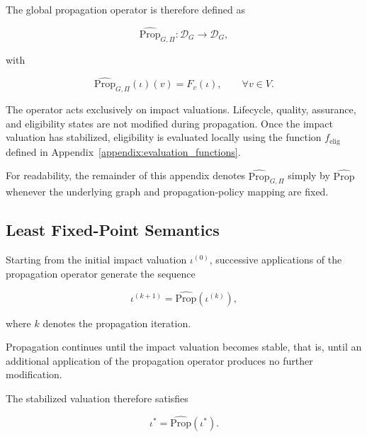 \documentclass[10pt]{article}
\begin{document}
The global propagation operator is therefore defined as

\begin{equation}
	\label{eq:impact_operator}
	\widehat{\mathrm{Prop}}_{G,\Pi}
	:
	\mathcal D_G
	\rightarrow
	\mathcal D_G,
\end{equation}

with

\begin{equation}
	\label{eq:impact_operator_definition}
	\widehat{\mathrm{Prop}}_{G,\Pi}(\iota)(v)
	=
	F_v(\iota),
	\qquad
	\forall v\in V.
\end{equation}

The operator acts exclusively on impact valuations.
Lifecycle, quality, assurance, and eligibility states are not modified during
propagation. Once the impact valuation has stabilized, eligibility is evaluated
locally using the function
$f_{\mathrm{elig}}$
defined in Appendix~\ref{appendix:evaluation_functions}.

For readability, the remainder of this appendix denotes
$\widehat{\mathrm{Prop}}_{G,\Pi}$ simply by
$\widehat{\mathrm{Prop}}$
whenever the underlying graph and propagation-policy mapping are fixed.

\subsection{Least Fixed-Point Semantics}

Starting from the initial impact valuation
$\iota^{(0)}$, successive applications of the propagation operator generate the
sequence

\begin{equation}
	\label{eq:impact_iteration}
	\iota^{(k+1)}
	=
	\widehat{\mathrm{Prop}}
	\!\left(
	\iota^{(k)}
	\right),
\end{equation}

where $k$ denotes the propagation iteration.

Propagation continues until the impact valuation becomes stable, that is, until
an additional application of the propagation operator produces no further
modification.

The stabilized valuation therefore satisfies

\begin{equation}
	\label{eq:impact_fixed_point}
	\iota^{*}
	=
	\widehat{\mathrm{Prop}}
	\!\left(
	\iota^{*}
	\right).
\end{equation}
\end{document}
